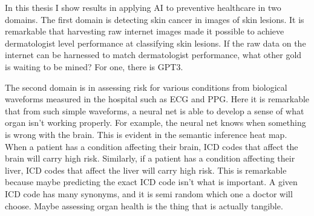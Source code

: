 In this thesis I show results in applying AI to preventive healthcare in two domains.  The first domain is detecting skin cancer in images of skin lesions.  It is remarkable that harvesting raw internet images made it possible to achieve dermatologist level performance at classifying skin lesions.  If the raw data on the internet can be harnessed to match dermatologist performance, what other gold is waiting to be mined?  For one, there is GPT3.  

The second domain is in assessing risk for various conditions from biological waveforms measured in the hospital such as ECG and PPG.  Here it is remarkable that from such simple waveforms, a neural net is able to develop a sense of what organ isn't working properly.  For example, the neural net knows when something is wrong with the brain.  This is evident in the semantic inference heat map.  When a patient has a condition affecting their brain, ICD codes that affect the brain will carry high risk.  Similarly, if a patient has a condition affecting their liver, ICD codes that affect the liver will carry high risk.  This is remarkable because maybe predicting the exact ICD code isn't what is important.  A given ICD code has many synonyms, and it is semi random which one a doctor will choose.  Maybe assessing organ health is the thing that is actually tangible.
